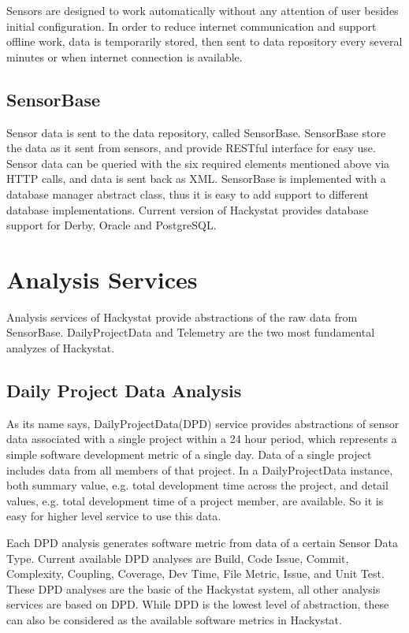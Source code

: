 Sensors are designed to work automatically without any attention of user besides initial configuration. In order to reduce internet communication and support offline work, data is temporarily stored, then sent to data repository every several minutes or when internet connection is available.

\subsection{SensorBase}
Sensor data is sent to the data repository, called SensorBase. SensorBase store the data as it sent from sensors, and provide RESTful interface for easy use. Sensor data can be queried with the six required elements mentioned above via HTTP calls, and data is sent back as XML. SensorBase is implemented with a database manager abstract class, thus it is easy to add support to different database implementations. Current version of Hackystat provides database support for Derby, Oracle and PostgreSQL.

\section{Analysis Services}
Analysis services of Hackystat provide abstractions of the raw data from SensorBase. DailyProjectData and Telemetry are the two most fundamental analyzes of Hackystat.

\subsection{Daily Project Data Analysis}
As its name says, DailyProjectData(DPD) service provides abstractions of sensor data associated with a single project within a 24 hour period, which represents a simple software development metric of a single day. Data of a single project includes data from all members of that project. In a DailyProjectData instance, both summary value, e.g. total development time across the project, and detail values, e.g. total development time of a project member, are available. So it is easy for higher level service to use this data.

Each DPD analysis generates software metric from data of a certain Sensor Data Type. Current available DPD analyses are Build, Code Issue, Commit, Complexity, Coupling, Coverage, Dev Time, File Metric, Issue, and Unit Test. These DPD analyses are the basic of the Hackystat system, all other analysis services are based on DPD. While DPD is the lowest level of abstraction, these can also be considered as the available software metrics in Hackystat.

